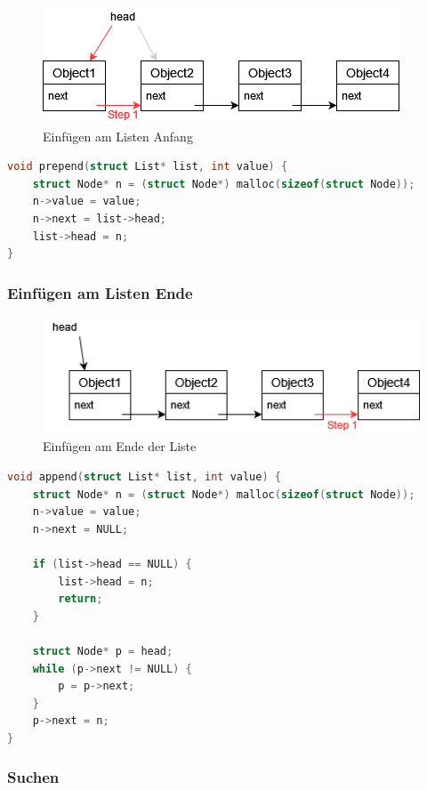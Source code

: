 \documentclass{article}
\begin{document}
\begin{figure}[h!]
  \centering
  \includegraphics[scale=0.6]{list_insert_front.png}
  \caption{Einfügen am Listen Anfang}
  \label{fig:list_insert_front}
\end{figure}

\begin{lstlisting}[language=c, tabsize=4]
void prepend(struct List* list, int value) {
    struct Node* n = (struct Node*) malloc(sizeof(struct Node));
    n->value = value;
    n->next = list->head;
    list->head = n;
}
\end{lstlisting}

\subsubsection{Einfügen am Listen Ende}

\begin{figure}[h!]
  \centering
  \includegraphics[scale=0.6]{list_insert_end.png}
  \caption{Einfügen am Ende der Liste}
  \label{fig:list_insert_end}
\end{figure}

\begin{lstlisting}[language=c, tabsize=4]
void append(struct List* list, int value) {
    struct Node* n = (struct Node*) malloc(sizeof(struct Node));
    n->value = value;
    n->next = NULL;
    
    if (list->head == NULL) {
        list->head = n;
        return;
    }
    
    struct Node* p = head;
    while (p->next != NULL) {
        p = p->next;
    }
    p->next = n;
}
\end{lstlisting}

\subsubsection{Suchen}
\end{document}
